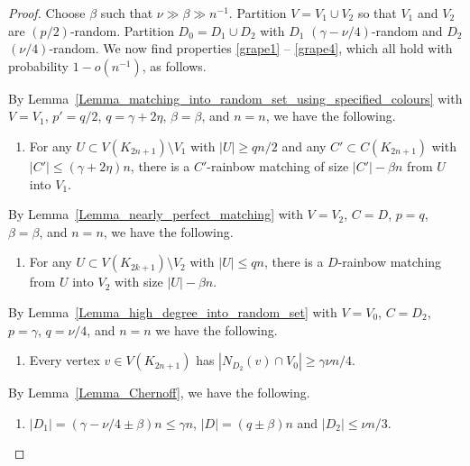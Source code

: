 \begin{proof}
Choose $\beta$ such that $\nu\gg \beta\gg n^{-1}$.
Partition $V=V_1\cup V_2$ so that $V_1$ and $V_2$ are $(p/2)$-random. Partition $D_0=D_1\cup D_2$  with $D_1$ $(\gamma-\nu/4)$-random and  $D_2$ $(\nu/4)$-random. We now find properties \ref{grape1} -- \ref{grape4}, which all hold with probability $1-o(n^{-1})$, as follows.

By Lemma~\ref{Lemma_matching_into_random_set_using_specified_colours} with $V=V_1$,   $p'=q/2$, $q=\gamma+2\eta$, $\beta=\beta$, and $n=n$, we have the following. 

\addtocounter{propcounter}{1}
\begin{enumerate}[label = {\bfseries \Alph{propcounter}\arabic{enumi}}]
\item For any $U\subset V(K_{2n+1})\setminus V_1$ with $|U|\geq qn/2$ and any $C'\subset C(K_{2n+1})$ with $|C'|\leq (\gamma +2\eta)n$, there is a $C'$-rainbow matching of size $|C'|-\beta n$ from $U$ into $V_1$. \label{grape1}
\end{enumerate}
By Lemma~\ref{Lemma_nearly_perfect_matching} with $V=V_2$, $C=D$, $p=q$, $\beta=\beta$, and $n=n$, we have the following. 
\begin{enumerate}[label = {\bfseries \Alph{propcounter}\arabic{enumi}}]
\item For any $U\subset V(K_{2k+1})\setminus V_2$ with $|U|\leq q n$, there is a $D$-rainbow matching from $U$ into $V_2$ with size $|U|-\beta n$.\label{grape2b}
\end{enumerate}
By Lemma~\ref{Lemma_high_degree_into_random_set} with $V=V_0$, $C=D_2$, $p=\gamma$, $q=\nu/4$, and $n=n$ we have the following.
\begin{enumerate}[label = {\bfseries \Alph{propcounter}\arabic{enumi}}]\addtocounter{enumi}{2}
\item Every vertex $v\in V(K_{2n+1})$ has $|N_{D_2}(v)\cap V_0|\geq \gamma\nu n/4$.\label{grape3}
\end{enumerate}
By Lemma~\ref{Lemma_Chernoff}, we have the following.
\begin{enumerate}[label = {\bfseries \Alph{propcounter}\arabic{enumi}}]\addtocounter{enumi}{3}
\item $|D_1|=(\gamma-\nu/4\pm \beta)n\leq \gamma n$, $|D|=(q\pm \beta)n$ and $|D_2| \leq \nu n/3$.\label{grape4}
\end{enumerate}


\end{proof}
